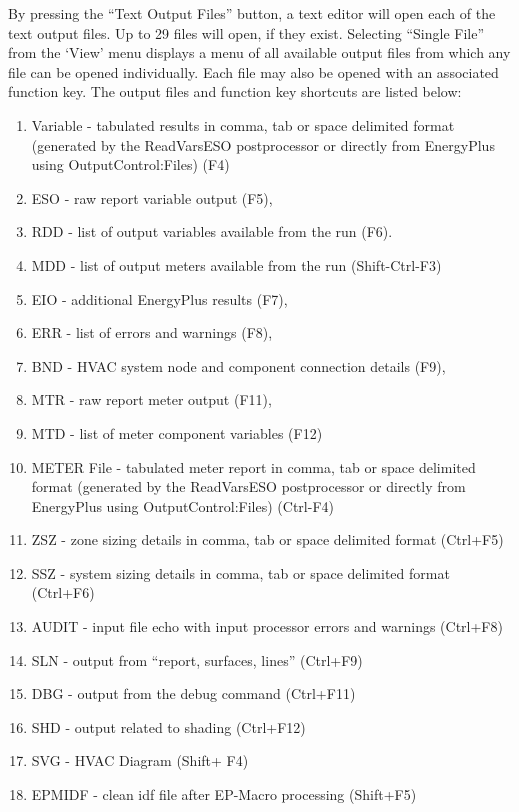 By pressing the ``Text Output Files'' button, a text editor will open each of the text output files. Up to 29 files will open, if they exist. Selecting ``Single File'' from the `View' menu displays a menu of all available output files from which any file can be opened individually. Each file may also be opened with an associated function key. The output files and function key shortcuts are listed below:

\begin{enumerate}
\def\labelenumi{\arabic{enumi}.}
\item
  Variable - tabulated results in comma, tab or space delimited format (generated by the ReadVarsESO postprocessor or directly from EnergyPlus using OutputControl:Files) (F4)
\item
  ESO - raw report variable output (F5),
\item
  RDD - list of output variables available from the run (F6).
\item
  MDD - list of output meters available from the run (Shift-Ctrl-F3)
\item
  EIO - additional EnergyPlus results (F7),
\item
  ERR - list of errors and warnings (F8),
\item
  BND - HVAC system node and component connection details (F9),
\item
  MTR - raw report meter output (F11),
\item
  MTD - list of meter component variables (F12)
\item
  METER File - tabulated meter report in comma, tab or space delimited format (generated by the ReadVarsESO postprocessor or directly from EnergyPlus using OutputControl:Files) (Ctrl-F4)
\item
  ZSZ - zone sizing details in comma, tab or space delimited format (Ctrl+F5)
\item
  SSZ - system sizing details in comma, tab or space delimited format (Ctrl+F6)
\item
  AUDIT - input file echo with input processor errors and warnings (Ctrl+F8)
\item
  SLN - output from ``report, surfaces, lines'' (Ctrl+F9)
\item
  DBG - output from the debug command (Ctrl+F11)
\item
  SHD - output related to shading (Ctrl+F12)
\item
  SVG - HVAC Diagram (Shift+ F4)
\item
  EPMIDF - clean idf file after EP-Macro processing (Shift+F5)

\end{enumerate}
